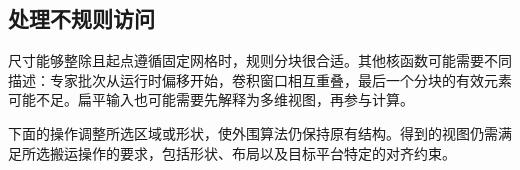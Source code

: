 \subsection*{处理不规则访问}

尺寸能够整除且起点遵循固定网格时，规则分块很合适。其他核函数可能需要不同描述：专家批次从运行时偏移开始，卷积窗口相互重叠，最后一个分块的有效元素可能不足。扁平输入也可能需要先解释为多维视图，再参与计算。

下面的操作调整所选区域或形状，使外围算法仍保持原有结构。得到的视图仍需满足所选搬运操作的要求，包括形状、布局以及目标平台特定的对齐约束。
